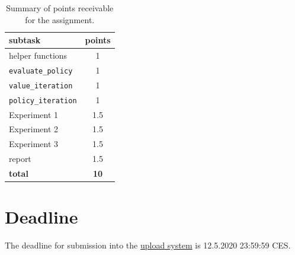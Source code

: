 \documentclass[10pt,journal,compsoc,twoside]{IEEEtran}
\begin{document}
\begin{table}[h]
\centering
 \begin{tabular}{l c} 
    subtask & points \\ 
    \hline
    helper functions & 1 \\
    {\lstinline|evaluate_policy|} & 1\\
    {\lstinline|value_iteration|} & 1 \\
    {\lstinline|policy_iteration|} & 1 \\
    \hline
    Experiment 1 & 1.5 \\ 
    Experiment 2 & 1.5 \\ 
    Experiment 3 & 1.5 \\ 
    \hline
    report & 1.5 \\ \hline \hline
    \textbf{total} & \textbf{10}\\
    \hline
 \end{tabular}
 \caption{Summary of points receivable for the assignment.}
 \label{tab:grading}
\end{table}

\section{Deadline}
The deadline for submission into the \href{https://cw.felk.cvut.cz/brute/student/}{upload system} is 12.5.2020 23:59:59 CES.
\printbibliography





%
\end{document}
